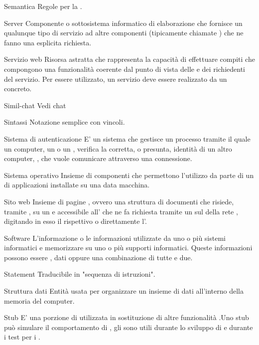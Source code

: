 \elemento
{Semantica}
{Regole per la .}

\elemento
{Server}
{Componente o sottosistema informatico di elaborazione che fornisce un qualunque tipo di servizio ad altre componenti (tipicamente chiamate ) che ne fanno una esplicita richiesta.}

\elemento
{Servizio web}
{Risorsa astratta che rappresenta la capacità di effettuare compiti che compongono una funzionalità coerente dal punto di vista delle  e dei richiedenti del servizio. Per essere utilizzato, un servizio deve essere realizzato da un  concreto.}

\elemento
{Simil-chat}
{Vedi chat}

\elemento
{Sintassi}
{Notazione semplice con vincoli.}

\elemento
{Sistema di autenticazione}
{E' un sistema che gestisce un processo tramite il quale un computer, un  o un , verifica la corretta, o presunta, identità di un altro computer, , che vuole comunicare attraverso una connessione.}

\elemento
{Sistema operativo}
{Insieme di componenti  che permettono l'utilizzo da parte di un  di applicazioni installate su una data macchina.}

\elemento
{Sito web}
{Insieme di pagine , ovvero una struttura  di documenti che risiede, tramite , su un  e accessibile all' che ne fa richiesta tramite un  sul  della rete , digitando in esso il rispettivo  o direttamente l'.}

\elemento
{Software}
{L'informazione o le informazioni utilizzate da uno o più sistemi informatici e memorizzare su uno o più supporti informatici. Queste informazioni possono essere , dati oppure una combinazione di tutte e due.}

\elemento
{Statement}
{Traducibile in "sequenza di istruzioni".}

\elemento
{Struttura dati}
{Entità usata per organizzare un insieme di dati all'interno della memoria del computer.}

\elemento
{Stub}
{E' una porzione di  utilizzata in sostituzione di altre funzionalità .Uno stub può simulare il comportamento di , gli  sono utili durante lo sviluppo di  e durante i test per i .}

